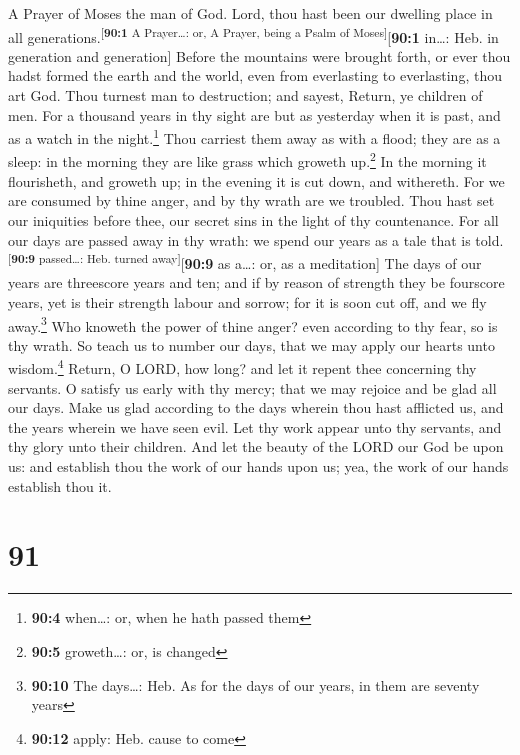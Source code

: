A Prayer of Moses the man of God.  Lord, thou hast been
our dwelling place in all generations.\textsuperscript{{[}\textbf{90:1}
A Prayer\ldots: or, A Prayer, being a Psalm of Moses{]}}{[}\textbf{90:1}
in\ldots: Heb. in generation and generation{]}  Before the
mountains were brought forth, or ever thou hadst formed the earth and
the world, even from everlasting to everlasting, thou art God.
 Thou turnest man to destruction; and sayest, Return, ye
children of men.  For a thousand years in thy sight are
but as yesterday when it is past, and as a watch in the
night.\footnote{\textbf{90:4} when\ldots: or, when he hath passed them}
 Thou carriest them away as with a flood; they are as a
sleep: in the morning they are like grass which groweth up.\footnote{\textbf{90:5}
  groweth\ldots: or, is changed}  In the morning it
flourisheth, and groweth up; in the evening it is cut down, and
withereth.  For we are consumed by thine anger, and by thy
wrath are we troubled.  Thou hast set our iniquities
before thee, our secret sins in the light of thy countenance.
 For all our days are passed away in thy wrath: we spend
our years as a tale that is told.\textsuperscript{{[}\textbf{90:9}
passed\ldots: Heb. turned away{]}}{[}\textbf{90:9} as a\ldots: or, as a
meditation{]}  The days of our years are threescore years
and ten; and if by reason of strength they be fourscore years, yet is
their strength labour and sorrow; for it is soon cut off, and we fly
away.\footnote{\textbf{90:10} The days\ldots: Heb. As for the days of
  our years, in them are seventy years}  Who knoweth the
power of thine anger? even according to thy fear, so is thy wrath.
 So teach us to number our days, that we may apply our
hearts unto wisdom.\footnote{\textbf{90:12} apply: Heb. cause to come}
 Return, O LORD, how long? and let it repent thee
concerning thy servants.  O satisfy us early with thy
mercy; that we may rejoice and be glad all our days. 
Make us glad according to the days wherein thou hast afflicted us, and
the years wherein we have seen evil.  Let thy work appear
unto thy servants, and thy glory unto their children. 
And let the beauty of the LORD our God be upon us: and establish thou
the work of our hands upon us; yea, the work of our hands establish thou
it.

\hypertarget{section-90}{%
\section{91}\label{section-90}}

